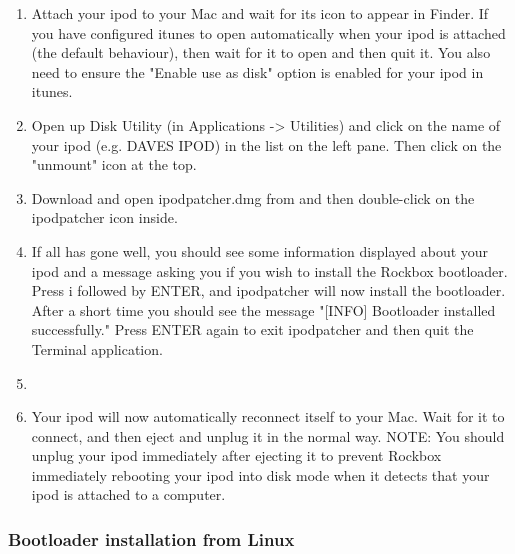 \begin{enumerate}

\item Attach your ipod to your Mac and wait for its icon to appear in 
Finder. If you have configured itunes to open automatically when your 
ipod is attached (the default behaviour), then wait for it to open and 
then quit it. You also need to ensure the "Enable use as disk" option 
is enabled for your ipod in itunes.

\item Open up Disk Utility (in Applications -> Utilities) and click 
on the name of your ipod (e.g. DAVES IPOD) in the list on the left 
pane. Then click on the "unmount" icon at the top. 

\item Download and open ipodpatcher.dmg from 
and then double-click on the ipodpatcher icon inside. 

\item If all has gone well, you should see some 
information displayed about your ipod and a message asking you if you 
wish to install the Rockbox bootloader. Press i followed by ENTER, and 
ipodpatcher will now install the bootloader. After a short time you 
should see the message "[INFO] Bootloader installed successfully." Press 
ENTER again to exit ipodpatcher and then quit the Terminal application.

\item {}

\item Your ipod will now automatically reconnect itself to your Mac. 
Wait for it to connect, and then eject and unplug it in the normal way. 
NOTE: You should unplug your ipod immediately after ejecting it to 
prevent Rockbox immediately rebooting your ipod into disk mode when it 
detects that your ipod is attached to a computer. 

\end{enumerate}

\subsubsection{Bootloader installation from Linux}

